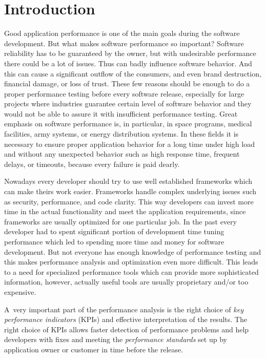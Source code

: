 


\chapter{Introduction}
\label{Introduction}
Good application performance is one of the main goals during the software development. But what makes software performance so important? Software reliability has to be guaranteed by the owner, but with undesirable performance there could be a lot of issues. Thus can badly influence software behavior. And this can cause a significant outflow of the consumers, and even brand destruction, financial damage, or loss of trust. These few reasons should be enough to do a proper performance testing before every software release, especially for large projects where industries guarantee certain level of software behavior and they would not be able to assure it with insufficient performance testing. Great emphasis on software performance is, in particular, in space programs, medical facilities, army systems, or energy distribution systems. In these fields it is necessary to ensure proper application behavior for a long time under high load and without any unexpected behavior such as high response time, frequent delays, or timeouts, because every failure is paid dearly. 

Nowadays every developer should try to use well established frameworks which can make theirs work easier. Frameworks handle complex underlying issues such as security, performance, and code clarity. This way developers can invest more time in the actual functionality and meet the application requirements, since frameworks are usually optimized for one particular job. In the past every developer had to spent significant portion of development time tuning performance which led to spending more time and money for software development. But not everyone has enough knowledge of performance testing and this makes performance analysis and optimization even more difficult. This leads to a need for specialized performance tools which can provide more sophisticated information, however, actually useful tools are usually proprietary and/or too expensive.

A~very important part of the performance analysis is the right choice of \emph{key performance indicators} (KPIs) \cite{Molyneaux:TAoAPT} and effective interpretation of the results. The right choice of KPIs allows faster detection of performance problems and help developers with fixes and meeting the \emph{performance standards} \cite{Molyneaux:TAoAPT} set up by application owner or customer in time before the release. 

